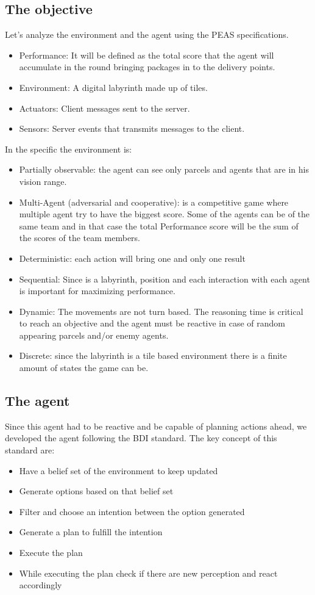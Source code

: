 \documentclass[conference]{IEEEtran}
\begin{document}
\subsection{The objective}
Let's analyze the environment and the agent using the PEAS specifications.
\begin{itemize}
    \item Performance: It will be defined as the total score that the agent will accumulate in the round bringing packages in to the delivery points.
    \item Environment: A digital labyrinth made up of tiles.
    \item Actuators: Client messages sent to the server.
    \item Sensors: Server events that transmits messages to the client.
\end{itemize}


In the specific the environment is:
\begin{itemize}
    \item Partially observable: the agent can see only parcels and agents that are in his vision range.
    \item Multi-Agent (adversarial and cooperative): is a competitive game where multiple agent try to have the biggest score. Some of the agents can be of the same team and in that case the total Performance score will be the sum of the scores of the team members.
    \item Deterministic: each action will bring one and only one result
    \item Sequential: Since is a labyrinth, position and each interaction with each agent is important  for maximizing performance.
    \item Dynamic: The movements are not turn based. The reasoning time is critical to reach an objective and the agent must be reactive in case of random appearing parcels and/or enemy agents.
    \item Discrete: since the labyrinth is a tile based environment there is a finite amount of states the game can be.

    \end{itemize}
\subsection{The agent}
Since this agent had to be reactive and be capable of planning actions ahead, we developed the agent following the BDI standard.
The key concept of this standard are:
\begin{itemize}
    \item Have a belief set of the environment to keep updated
    \item Generate options based on that belief set
    \item Filter and choose an intention between the option generated
    \item Generate a plan to fulfill the intention
    \item Execute the plan
    \item While executing the plan check if there are new perception and react accordingly
\end{itemize}
\end{document}
